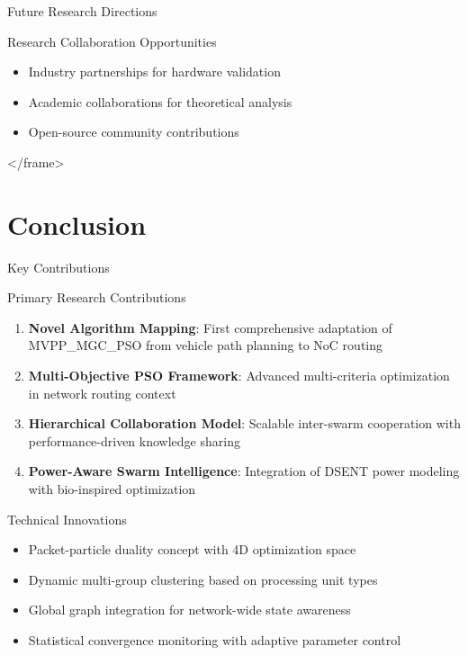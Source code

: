 \documentclass[10pt]{beamer}
\begin{document}
\begin{frame}{Future Research Directions}
    \begin{block}{Research Collaboration Opportunities}
        \begin{itemize}
            \item Industry partnerships for hardware validation
            \item Academic collaborations for theoretical analysis
            \item Open-source community contributions
        \end{itemize}
    \end{block}
</frame>

\section{Conclusion}

\begin{frame}{Key Contributions}
    \begin{block}{Primary Research Contributions}
        \begin{enumerate}
            \item \textbf{Novel Algorithm Mapping}: First comprehensive adaptation of MVPP\_MGC\_PSO from vehicle path planning to NoC routing
            \item \textbf{Multi-Objective PSO Framework}: Advanced multi-criteria optimization in network routing context
            \item \textbf{Hierarchical Collaboration Model}: Scalable inter-swarm cooperation with performance-driven knowledge sharing
            \item \textbf{Power-Aware Swarm Intelligence}: Integration of DSENT power modeling with bio-inspired optimization
        \end{enumerate}
    \end{block}
    
    \begin{exampleblock}{Technical Innovations}
        \begin{itemize}
            \item Packet-particle duality concept with 4D optimization space
            \item Dynamic multi-group clustering based on processing unit types
            \item Global graph integration for network-wide state awareness
            \item Statistical convergence monitoring with adaptive parameter control
        \end{itemize}
    \end{exampleblock}
\end{frame}


\end{frame}
\end{document}
